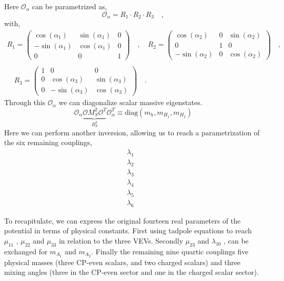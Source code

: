 Here $\mathcal{O}_\alpha$ can be parametrized as, 
\begin{equation}
\mathcal{O}_\alpha = R_1 \cdot R_2 \cdot R_3 \quad , 
\end{equation}
with, 
\begin{gather}
R_1 = \begin{pmatrix}
\cos(\alpha_1) & \sin(\alpha_1) & 0 \\
-\sin(\alpha_1) & \cos(\alpha_1) & 0 \\ 
0 & 0 & 1 
\end{pmatrix} \quad , \quad R_2 = \begin{pmatrix}
\cos(\alpha_2) & 0 & \sin(\alpha_2) \\ 
0 & 1 & 0 \\
-\sin(\alpha_2) & 0 & \cos(\alpha_2) 
\end{pmatrix} \quad ,\\ \\ \quad R_3 = \begin{pmatrix}
1 & 0 & 0 \\
0 & \cos(\alpha_3 ) & \sin(\alpha_3) \\
0 & -\sin(\alpha_3) & \cos(\alpha_3) 
\end{pmatrix} \quad . 
\end{gather}
Through this $\mathcal{O}_\alpha$ we can diagonalize scalar massive eigenstates. 
\begin{equation}
\mathcal{O}_\alpha \underbrace{\mathcal{O} M^2_S \mathcal{O}^T }_{B_S^2} \mathcal{O}_\alpha^T \equiv \text{diag}(m_h,m_{H_1},m_{H_2})
\end{equation}
Here we can perform another inversion, allowing us to reach a parametrization of the six remaining couplings, 
\begin{equation}
\begin{split}
\lambda_1 & \\ 
\lambda_2 & \\ 
\lambda_3 & \\ 
\lambda_4 & \\ 
\lambda_5 & \\ 
\lambda_6 & 
\end{split} 
\end{equation}

To recapitulate, we can express the original fourteen real parameters of the potential in terms of physical constants. First using tadpole equations to reach $\mu_{11}$ , $\mu_{22}$ and $\mu_{33}$ in relation to the three VEVs. Secondly $\mu_{23}$ and $\lambda_10$ , can be exchanged for $m_{A_1}$ and $m_{A_2}$. Finally the remaining nine quartic couplings five physical masses (three CP-even scalars, and two charged scalars) and three mixing angles (three in the CP-even sector and one in the charged scalar sector). 

